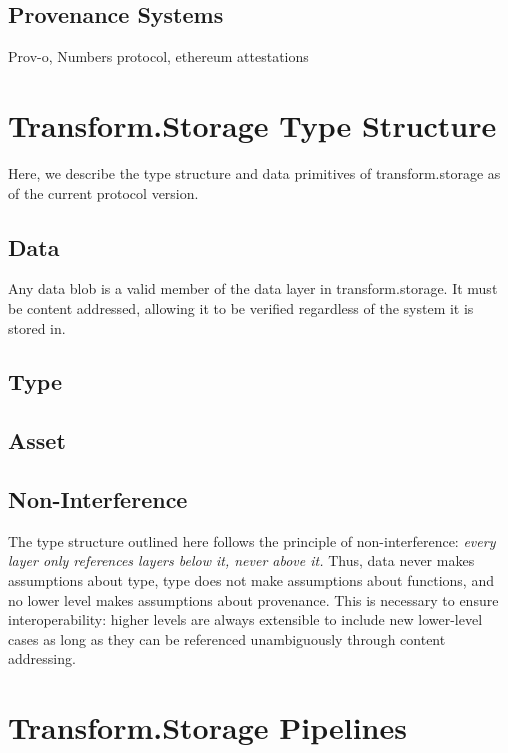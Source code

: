 \documentclass[9pt, oneside]{article}   	%
\begin{document}
\begin{multicols}{2}
\subsection{Provenance Systems}\label{smc}
Prov-o, Numbers protocol, ethereum attestations 

\section{Transform.Storage Type Structure}\label{transformtypes}

Here, we describe the type structure and data primitives of transform.storage as of the current protocol version.

\subsection{Data}\label{data}

Any data blob is a valid member of the data layer in transform.storage. It must be content addressed, allowing it to be verified regardless of the system it is stored in.

\subsection{Type}\label{type}

\subsection{Asset}\label{type}

\subsection{Non-Interference}\label{nonInterference}
The type structure outlined here follows the principle of non-interference: \textit{every layer only references layers below it, never above it.} Thus, data never makes assumptions about type, type does not make assumptions about functions, and no lower level makes assumptions about provenance. This is necessary to ensure interoperability: higher levels are always extensible to include new lower-level cases as long as they can be referenced unambiguously through content addressing. 

\section{Transform.Storage Pipelines}\label{transformpipes}


\end{multicols}
\end{document}
